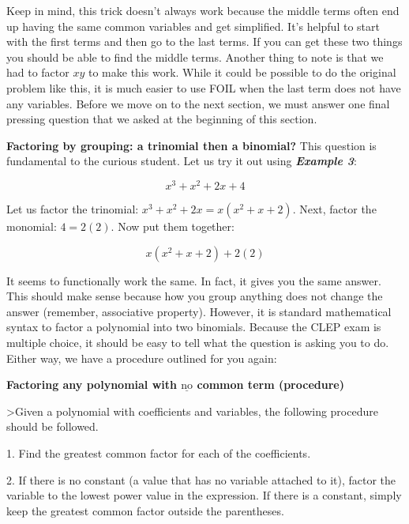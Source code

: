 Keep in mind, this trick doesn't always work because the middle terms often end up having
the same common variables and get simplified. It's helpful to start with the first terms
and then go to the last terms. If you can get these two things you should be able to find
the middle terms. Another thing to note is that we had to factor $xy$ to make this work.
While it could be possible to do the original problem like this, it is much easier to use
FOIL when the last term does not have any variables. Before we move on to the next
section, we must answer one final pressing question that we asked at the beginning of this
section.



\textbf{Factoring by grouping: a trinomial then a binomial?} This question is fundamental to the curious student. Let us try it out using \textbf{\textit{Example 3}}:



$$x^3+x^2+2x+4$$



Let us factor the trinomial: $x^3+x^2+2x=x\left(x^{2}+x+2\right)$. Next, factor the
monomial: $4=2\left(2\right)$. Now put them together:



$$x\left(x^{2}+x+2\right)+2\left(2\right)$$



It seems to functionally work the same. In fact, it gives you the same answer. This should
make sense because how you group anything does not change the answer (remember,
associative property). However, it is standard mathematical syntax to factor a polynomial
into two binomials. Because the CLEP exam is multiple choice, it should be easy to tell
what the question is asking you to do. Either way, we have a procedure outlined for you
again:



\textbf{Factoring any polynomial with $\underline{\text{no}}$ common term (procedure)}



>Given a polynomial with coefficients and variables, the following procedure should be followed.

    1.  Find the greatest common factor for each of the coefficients.

    2.  If there is no constant (a value that has no variable attached to it), factor the
    variable to the lowest power value in the expression. If there is a constant, simply
    keep the greatest common factor outside the parentheses.

